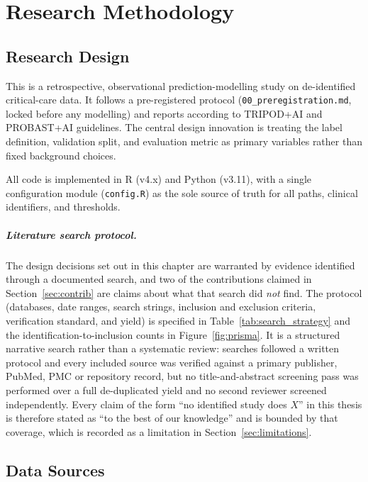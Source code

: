 \chapter{Research Methodology}
\label{ch:methodology}


\section{Research Design}

This is a retrospective, observational prediction-modelling study on
de-identified critical-care data. It follows a pre-registered protocol
(\texttt{00\_preregistration.md}, locked before any modelling) and reports
according to TRIPOD+AI \cite{collins2024tripodai} and PROBAST+AI
\cite{moons2025probastai} guidelines. The central design innovation is
treating the label definition, validation split, and evaluation metric as
primary variables rather than fixed background choices.

All code is implemented in R (v4.x) and Python (v3.11), with a single
configuration module (\texttt{config.R}) as the sole source of truth for all
paths, clinical identifiers, and thresholds.

\paragraph{Literature search protocol.} The design decisions set out in this
chapter are warranted by evidence identified through a documented search, and
two of the contributions claimed in Section~\ref{sec:contrib} are claims about
what that search did \emph{not} find. The protocol (databases, date ranges,
search strings, inclusion and exclusion criteria, verification standard, and
yield) is specified in Table~\ref{tab:search_strategy} and the
identification-to-inclusion counts in Figure~\ref{fig:prisma}. It is a
structured narrative search rather than a systematic review: searches followed
a written protocol and every included source was verified against a primary
publisher, PubMed, PMC or repository record, but no title-and-abstract
screening pass was performed over a full de-duplicated yield and no second
reviewer screened independently. Every claim of the form ``no identified study
does $X$'' in this thesis is therefore stated as ``to the best of our
knowledge'' and is bounded by that coverage, which is recorded as a limitation
in Section~\ref{sec:limitations}.


\section{Data Sources}
\label{sec:data}

